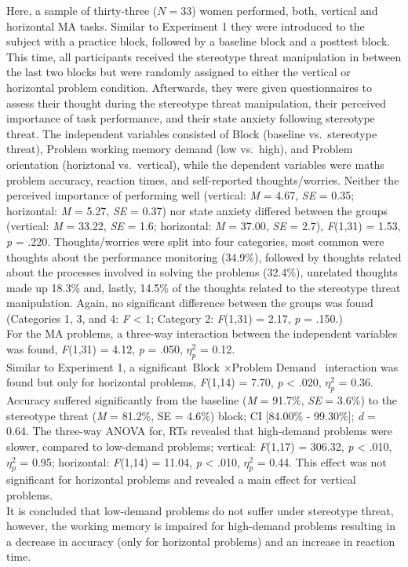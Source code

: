 \documentclass[
  stu,floatsintext]{apa7}
\begin{document}
Here, a sample of thirty-three (\(N = 33\)) women performed, both, vertical and horizontal MA tasks.
Similar to Experiment 1 they were introduced to the subject with a practice block, followed by a baseline block and a posttest block.
This time, all participants received the stereotype threat manipulation in between the last two blocks but were randomly assigned to either the vertical or horizontal problem condition.
Afterwards, they were given questionnaires to assess their thought during the stereotype threat manipulation, their perceived importance of task performance, and their state anxiety following stereotype threat.
The independent variables consisted of Block (baseline vs.~stereotype threat), Problem working memory demand (low vs.~high), and Problem orientation (horiztonal vs.~vertical), while the dependent variables were maths problem accuracy, reaction times, and self-reported thoughts/worries.
Neither the perceived importance of performing well (vertical: \emph{M} = 4.67, \emph{SE} = 0.35; horizontal: \emph{M} = 5.27, \emph{SE} = 0.37) nor state anxiety differed between the groups (vertical: \emph{M} = 33.22, \emph{SE} = 1.6; horizontal: \emph{M} = 37.00, \emph{SE} = 2.7), \emph{F}(1,31) = 1.53, \emph{p} = .220.
Thoughts/worries were split into four categories, most common were thoughts about the performance monitoring (34.9\%), followed by thoughts related about the processes involved in solving the problems (32.4\%), unrelated thoughts made up 18.3\% and, lastly, 14.5\% of the thoughts related to the stereotype threat manipulation.
Again, no significant difference between the groups was found (Categories 1, 3, and 4: \emph{F} \textless{} 1; Category 2: \emph{F}(1,31) = 2.17, \emph{p} = .150.)\\
For the MA problems, a three-way interaction between the independent variables was found, \emph{F}(1,31) = 4.12, \emph{p} = .050, \(\eta^{2}_{p}\) = 0.12.\\
Similar to Experiment 1, a significant \(\text{Block } \times \text{Problem Demand }\) interaction was found but only for horizontal problems, \emph{F}(1,14) = 7.70, \emph{p} \textless{} .020, \(\eta^{2}_{p}\) = 0.36.
Accuracy suffered significantly from the baseline (\emph{M} = 91.7\%, \emph{SE} = 3.6\%) to the stereotype threat (\emph{M} = 81.2\%, SE = 4.6\%) block; CI {[}84.00\% - 99.30\%{]}; \emph{d} = 0.64.
The three-way ANOVA for, RTs revealed that high-demand problems were slower, compared to low-demand problems; vertical: \emph{F}(1,17) = 306.32, \emph{p} \textless{} .010, \(\eta^{2}_{p}\) = 0.95; horizontal: \emph{F}(1,14) = 11.04, \emph{p} \textless{} .010, \(\eta^{2}_{p}\) = 0.44.
This effect was not significant for horizontal problems and revealed a main effect for vertical problems.\\
It is concluded that low-demand problems do not suffer under stereotype threat, however, the working memory is impaired for high-demand problems resulting in a decrease in accuracy (only for horizontal problems) and an increase in reaction time.
\end{document}

